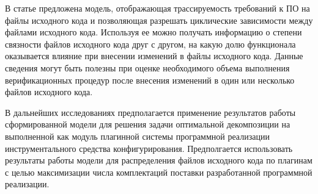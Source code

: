

В статье предложена модель, отображающая трассируемость требований к ПО на файлы исходного кода и позволяющая разрешать циклические зависимости между файлами исходного кода. Используя ее можно получать информацию о степени связности файлов исходного кода друг с другом, на какую долю функционала оказывается влияние при внесении изменений в файлы исходного кода. Данные сведения могут быть полезны при оценке необходимого объема выполнения верификационных процедур после внесения изменений в один или несколько файлов исходного кода.

В дальнейших исследованиях предполагается применение результатов работы сформированной модели для решения задачи оптимальной декомпозиции на выполненной как модуль плагинной системы программной реализации инструментального средства конфигурирования. Предполгается использовать результаты работы модели для распределения файлов исходного кода по плагинам с целью максимизации числа комплектаций поставки разработанной программной реализации.